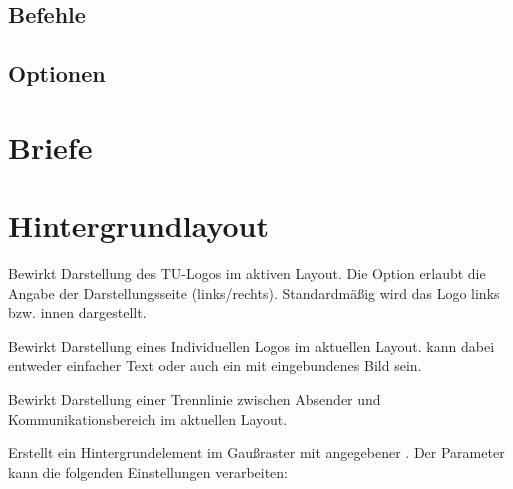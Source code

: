 \documentclass[a4paper,11pt]{tubsreprt}
\begin{document}
\section{Befehle}

\section{Optionen}


\chapter{Briefe}



\chapter{Hintergrundlayout}

\begin{Declaration}
\end{Declaration}

Bewirkt Darstellung des TU-Logos im aktiven Layout. Die Option 
erlaubt die Angabe der Darstellungsseite (links/rechts). Standardmäßig
wird das Logo links bzw. innen dargestellt.

\begin{Declaration}
\end{Declaration}

Bewirkt Darstellung eines Individuellen Logos im aktuellen Layout.
 kann dabei entweder einfacher Text oder auch ein 
mit  eingebundenes Bild sein.

\begin{Declaration}
\end{Declaration}

Bewirkt Darstellung einer Trennlinie zwischen Absender und Kommunikationsbereich
im aktuellen Layout.

\begin{Declaration}
\end{Declaration}

Erstellt ein Hintergrundelement im Gaußraster mit angegebener .
Der Parameter  kann die folgenden Einstellungen verarbeiten:

\begin{Declaration}
  \\
  \\
\end{Declaration}
\end{document}
